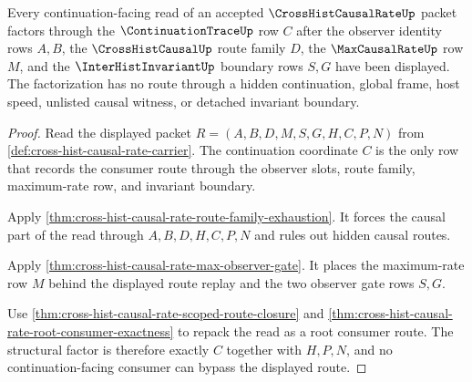 \begin{theorem}
\label{thm:cross-hist-causal-rate-continuationtrace-factorization}
Every continuation-facing read of an accepted $\CrossHistCausalRateUp$ packet factors through the $\ContinuationTraceUp$ row $C$ after the observer identity rows $A,B$, the $\CrossHistCausalUp$ route family $D$, the $\MaxCausalRateUp$ row $M$, and the $\InterHistInvariantUp$ boundary rows $S,G$ have been displayed. The factorization has no route through a hidden continuation, global frame, host speed, unlisted causal witness, or detached invariant boundary.
\end{theorem}
\begin{proof}
Read the displayed packet $R=(A,B,D,M,S,G,H,C,P,N)$ from \autoref{def:cross-hist-causal-rate-carrier}. The continuation coordinate $C$ is the only row that records the consumer route through the observer slots, route family, maximum-rate row, and invariant boundary.

Apply \autoref{thm:cross-hist-causal-rate-route-family-exhaustion}. It forces the causal part of the read through $A,B,D,H,C,P,N$ and rules out hidden causal routes.

Apply \autoref{thm:cross-hist-causal-rate-max-observer-gate}. It places the maximum-rate row $M$ behind the displayed route replay and the two observer gate rows $S,G$.

Use \autoref{thm:cross-hist-causal-rate-scoped-route-closure} and \autoref{thm:cross-hist-causal-rate-root-consumer-exactness} to repack the read as a root consumer route. The structural factor is therefore exactly $C$ together with $H,P,N$, and no continuation-facing consumer can bypass the displayed route.
\end{proof}

